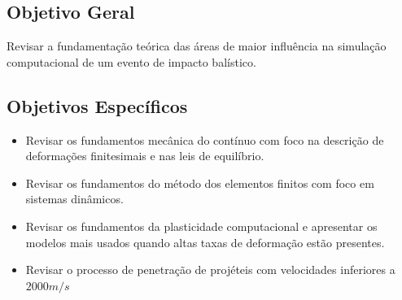 \subsection{Objetivo Geral}

Revisar a fundamentação teórica das áreas de maior influência na simulação computacional de um evento de impacto balístico.

\subsection{Objetivos Específicos}

\begin{itemize}
    \item Revisar os fundamentos mecânica do contínuo com foco na descrição de deformações finitesimais e nas leis de equilíbrio.
    \item Revisar os fundamentos do método dos elementos finitos com foco em sistemas dinâmicos.
    \item Revisar os fundamentos da plasticidade computacional e apresentar os modelos mais usados quando altas taxas de deformação estão presentes.
    \item Revisar o processo de penetração de projéteis com velocidades inferiores a $2000 m/s$
\end{itemize}